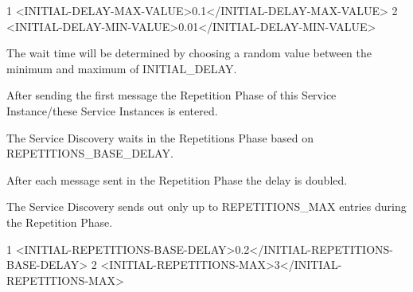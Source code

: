 \begin{DoxyCode}
1 <\textcolor{keywordtype}{INITIAL-DELAY-MAX-VALUE}>0.1</\textcolor{keywordtype}{INITIAL-DELAY-MAX-VALUE}>
2 <\textcolor{keywordtype}{INITIAL-DELAY-MIN-VALUE}>0.01</\textcolor{keywordtype}{INITIAL-DELAY-MIN-VALUE}>
\end{DoxyCode}

\begin{DoxyItemize}
\item The wait time will be determined by choosing a random value between the minimum and maximum of I\+N\+I\+T\+I\+A\+L\+\_\+\+D\+E\+L\+AY.
\item After sending the first message the Repetition Phase of this Service Instance/these Service Instances is entered.
\item The Service Discovery waits in the Repetitions Phase based on R\+E\+P\+E\+T\+I\+T\+I\+O\+N\+S\+\_\+\+B\+A\+S\+E\+\_\+\+D\+E\+L\+AY.
\item After each message sent in the Repetition Phase the delay is doubled.
\item The Service Discovery sends out only up to R\+E\+P\+E\+T\+I\+T\+I\+O\+N\+S\+\_\+\+M\+AX entries during the Repetition Phase.
\end{DoxyItemize}


\begin{DoxyCode}
1 <\textcolor{keywordtype}{INITIAL-REPETITIONS-BASE-DELAY}>0.2</\textcolor{keywordtype}{INITIAL-REPETITIONS-BASE-DELAY}>
2 <\textcolor{keywordtype}{INITIAL-REPETITIONS-MAX}>3</\textcolor{keywordtype}{INITIAL-REPETITIONS-MAX}>
\end{DoxyCode}

